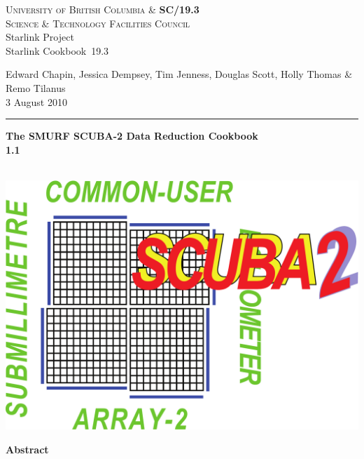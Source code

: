 \documentclass[twoside,11pt]{article}
\newcommand{\stardoccategory}  {Starlink Cookbook}
\newcommand{\stardocinitials}  {SC}
\newcommand{\stardocnumber}    {19.3}
\newcommand{\stardocauthors}   {Edward Chapin, Jessica Dempsey, Tim Jenness, Douglas Scott, Holly Thomas \& Remo Tilanus}
\newcommand{\stardocdate}      {3 August 2010}
\newcommand{\stardoctitle}     {The SMURF SCUBA-2 Data Reduction Cookbook}
\newcommand{\stardocversion}   {1.1}
\newcommand{\stardocmanual}    {\ }
\newcommand{\stardocname}{\stardocinitials /\stardocnumber}
\newenvironment{latexonly}{}{}
\renewcommand{\_}{\texttt{\symbol{95}}}
\begin{document}
\thispagestyle{empty}

\begin{latexonly}
   \textsc{University of British Columbia \&} \hfill \textbf{\stardocname}\\
   {\textsc{Science \& Technology Facilities Council}}\\
   {\large Starlink Project\\}
   {\large \stardoccategory\ \stardocnumber}
   \begin{flushright}
   \stardocauthors\\
   \stardocdate
   \end{flushright}
   \vspace{-4mm}
   \rule{\textwidth}{0.5mm}
   \vspace{5mm}
   \begin{center}
   {\Huge\textbf{\stardoctitle \\ [2.5ex]}}
   {\LARGE\textbf{\stardocversion \\ [4ex]}}
   {\Huge\textbf{\stardocmanual}}
   \end{center}
   \vspace{5mm}

\begin{center}
\hspace{1.3in}\includegraphics[scale=0.3]{sc19_logo}
\end{center}

   \vspace{10mm}
   \begin{center}
      {\Large\textbf{Abstract}}
   \end{center}
\end{latexonly}
\end{document}
